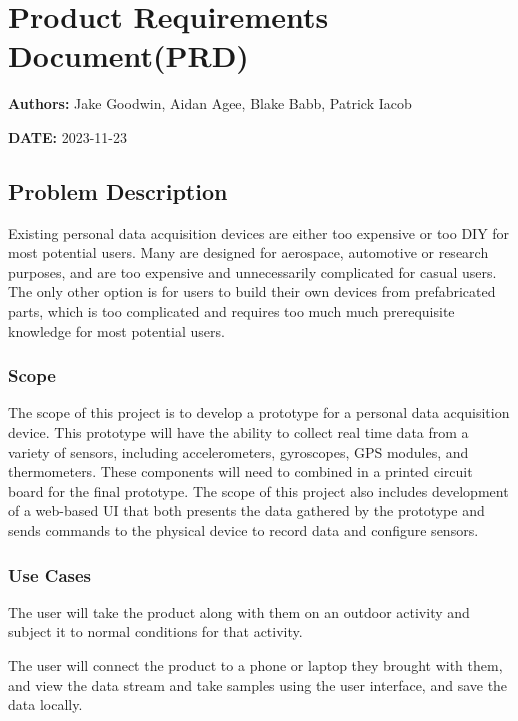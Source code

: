 \hypertarget{product-requirements-documentprd}{%
\section{Product Requirements
Document(PRD)}\label{product-requirements-documentprd}}

\textbf{Authors:} Jake Goodwin, Aidan Agee, Blake Babb, Patrick Iacob

\textbf{DATE:} 2023-11-23

\hypertarget{problem-description}{%
\subsection{Problem Description}\label{problem-description}}

Existing personal data acquisition devices are either too expensive or
too DIY for most potential users. Many are designed for aerospace,
automotive or research purposes, and are too expensive and unnecessarily
complicated for casual users. The only other option is for users to
build their own devices from prefabricated parts, which is too
complicated and requires too much much prerequisite knowledge for most
potential users.

\hypertarget{scope}{%
\subsubsection{Scope}\label{scope}}

The scope of this project is to develop a prototype for a personal data
acquisition device. This prototype will have the ability to collect real
time data from a variety of sensors, including accelerometers,
gyroscopes, GPS modules, and thermometers. These components will need to
combined in a printed circuit board for the final prototype. The scope
of this project also includes development of a web-based UI that both
presents the data gathered by the prototype and sends commands to the
physical device to record data and configure sensors.

\hypertarget{use-cases}{%
\subsubsection{Use Cases}\label{use-cases}}

The user will take the product along with them on an outdoor activity
and subject it to normal conditions for that activity.

The user will connect the product to a phone or laptop they brought with
them, and view the data stream and take samples using the user
interface, and save the data locally.

